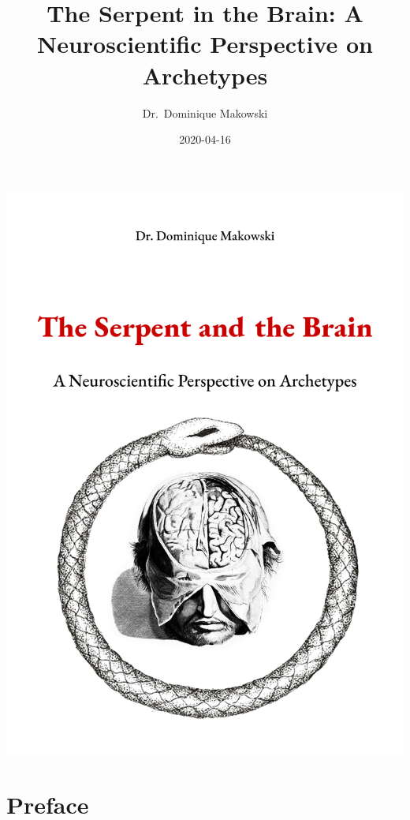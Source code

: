 \documentclass[
]{book}
\title{The Serpent in the Brain: A Neuroscientific Perspective on Archetypes}
\author{Dr.~Dominique Makowski}
\date{2020-04-16}
\let\oldmaketitle\maketitle
\begin{document}
\maketitle

\thispagestyle{empty}
\begin{center}
\includegraphics{img/cover.png}
\end{center}

\let\maketitle\oldmaketitle
\maketitle

{
\hypersetup{linkcolor=}
\setcounter{tocdepth}{1}
\tableofcontents
}
\listoftables
\listoffigures
\hypertarget{preface}{%
\chapter*{Preface}\label{preface}}
\end{document}
